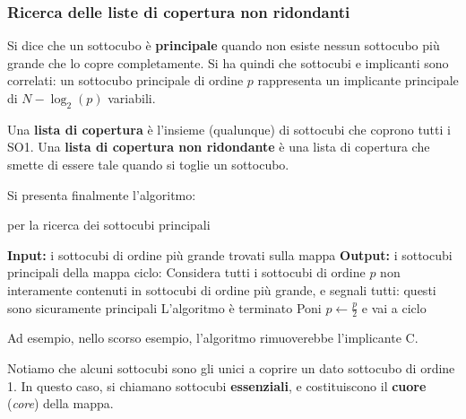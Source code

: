 \documentclass[a4paper,11pt]{article}
\begin{document}
\subsubsection{Ricerca delle liste di copertura non ridondanti}

Si dice che un sottocubo è \textbf{principale} quando non esiste nessun sottocubo più grande che lo copre completamente.
Si ha quindi che sottocubi e implicanti sono correlati: un sottocubo principale di ordine $p$ rappresenta un implicante principale di $N - \log_2(p)$ variabili.

Una \textbf{lista di copertura} è l'insieme (qualunque) di sottocubi che coprono tutti i SO1.
Una \textbf{lista di copertura non ridondante} è una lista di copertura che smette di essere tale quando si toglie un sottocubo.

Si presenta finalmente l'algoritmo:
\begin{algorithm}
\caption{per la ricerca dei sottocubi principali}
\begin{algorithmic}
	\STATE \textbf{Input:} i sottocubi di ordine più grande trovati sulla mappa 
	\STATE \textbf{Output:} i sottocubi principali della mappa
	\STATE \textsf{ciclo:}
	\STATE Considera tutti i sottocubi di ordine $p$ non interamente contenuti in sottocubi di ordine più grande, e
	segnali tutti: questi sono sicuramente principali
		\STATE L'algoritmo è terminato 
	\ELSE 
		\STATE Poni $p \leftarrow \frac{p}{2}$ e vai a \textsf{ciclo}
	\ENDIF 
\end{algorithmic}
\end{algorithm}

Ad esempio, nello scorso esempio, l'algoritmo rimuoverebbe l'implicante C.

\par\smallskip

Notiamo che alcuni sottocubi sono gli unici a coprire un dato sottocubo di ordine 1. In questo caso, si chiamano sottocubi \textbf{essenziali}, e costituiscono il \textbf{cuore} (\textit{core}) della mappa.
\end{document}
